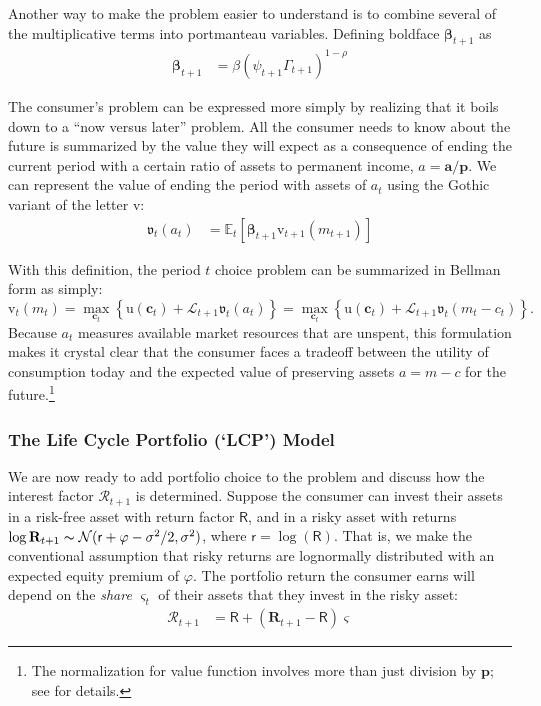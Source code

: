 \documentclass{article}
\newcommand{\CRRA}{\rho}
\newcommand{\uFunc}{\mathrm{u}}
\newcommand{\cLvl}{\mathbf{c}}
\newcommand{\aLvl}{\mathbf{a}}
\newcommand{\Rport}{\mathcal{R}}
\newcommand{\pLvl}{\mathbf{p}}
\newcommand{\DiscFac}{\beta}
\newcommand{\vFunc}{\mathrm{v}}
\newcommand{\Alive}{\mathcal{L}}
\newcommand{\Ex}{\mathbb{E}}
\newcommand{\permGroFac}{\Gamma}
\newcommand{\permShk}{\psi}
\newcommand{\cNrm}{c}
\newcommand{\RNrm}{\mathcal{R}}
\newcommand{\aNrm}{a}
\newcommand{\mNrm}{m}
\newcommand{\Rfree}{\mathsf{R}}
\newcommand{\rfree}{\mathsf{r}}
\newcommand{\eprem}{\varphi}
\newcommand{\Risky}{\mathbf{R}}
\begin{document}
Another way to make the problem easier to understand is to combine several of the multiplicative terms into portmanteau variables.
Defining boldface $\pmb{\DiscFac}_{t+1}$ as
\begin{align}
     \pmb{\DiscFac}_{t+1} & ={\beta} (\permShk_{t+1} \permGroFac_{t+1})^{1-\CRRA}
\end{align}


The consumer's problem can be expressed more simply by realizing that it boils down to a ``now versus later'' problem.
All the consumer needs to know about the future is summarized by the value they will expect as a consequence of ending the current period with a certain ratio of assets to permanent income, $\aNrm = \aLvl/\pLvl$.
We can represent the value of ending the period with assets of $\aNrm_t$ using the Gothic variant of the letter $\vFunc$:
\begin{align}
    \mathfrak{v}_{t}(\aNrm_{t}) & = \Ex_{t}[\pmb{\DiscFac}_{t+1}\vFunc_{t+1}(\mNrm_{t+1})]
\end{align}

With this definition, the period $t$ choice problem can be summarized in Bellman form as simply:
\begin{equation}
\vFunc_t(\mNrm_t) = \max_{\cLvl_t} \left\{ \uFunc(\cLvl_{t}) + \Alive_{t+1} \mathfrak{v}_{t}(\aNrm_{t}) \right\} = \max_{\cLvl_t} \left\{ \uFunc(\cLvl_{t}) + \Alive_{t+1} \mathfrak{v}_{t}(\mNrm_{t} - \cNrm_t) \right\}.
\end{equation}
Because $\aNrm_t$ measures available market resources that are unspent, this formulation makes it crystal clear that the consumer faces a tradeoff between the utility of consumption today and the expected value of preserving assets $\aNrm=\mNrm -\cNrm$ for the future.\footnote{The normalization for value function involves more than just division by $\pLvl$; see \cite{BufferStockTheory} for details.}

\subsubsection{The Life Cycle Portfolio (`LCP') Model}\label{lcp-model}

We are now ready to add portfolio choice to the problem and discuss how the interest factor $\Rport_{t+1}$ is determined.
Suppose the consumer can invest their assets in a risk-free asset with return factor $\Rfree$, and in a risky asset with returns $\log \Risky_{t+1} \thicksim \mathcal{N}(\rfree + \eprem - \sigma^{2}/2, \sigma^{2})$, where $\rfree = \log(\Rfree)$.
That is, we make the conventional assumption that risky returns are lognormally distributed with an expected equity premium of $\eprem$.
The portfolio return the consumer earns will depend on the \textit{share} $\varsigma_t$ of their assets that they invest in the risky asset:
\begin{align}
    \Rport_{t+1} & = \Rfree + (\Risky_{t+1}-\Rfree)\varsigma
\end{align}
\end{document}
